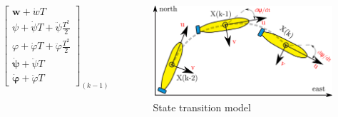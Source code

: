 \begin{frame}
\begin{columns}
\begin{tiny}
\begin{equation}
\begin{bmatrix}
                \boldsymbol{w} + \dot{w}T \\ 
                \psi    + \dot{\psi}T    + \ddot{\psi}   \frac{T^{2}}{2} \\ 
                \varphi + \dot{\varphi}T + \ddot{\varphi}\frac{T^{2}}{2} \\ 
                \boldsymbol{\dot{\psi}}    + \ddot{\psi}T \\ 
                \boldsymbol{\dot{\varphi}} + \ddot{\varphi}T
\end{bmatrix}_{(k-1)} 
\label{eq:state-tran}
\end{equation} %
\end{tiny}
\begin{figure}
\includegraphics[width=0.98\linewidth]{fig/model.pdf}
\caption{{\scriptsize State transition model}}
\label{fig:state-tran}
\end{figure}
\end{columns}
\end{frame}